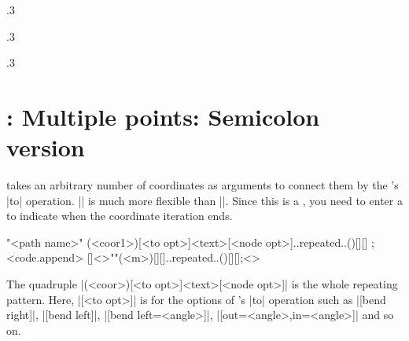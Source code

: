 \begin{tzcode}{.3}
\end{tzcode}

\begin{tzcode}{.3}
\end{tzcode}


\begin{tzcode}{.3}
\end{tzcode}




\section{\protect\cmd{\tztos}: Multiple points: Semicolon version}
\label{s:tztos}

\icmd{\tztos} takes an arbitrary number of coordinates as arguments to connect them by the \Tikz's |to| operation. |\tztos| is much more flexible than |\tzlines|. Since this is a , you need to enter a  to indicate when the coordinate iteration ends.

\begin{tzdef}{}
"<path name>"
      (<coor1>)[<to opt>]{<text>}[<node opt>]..repeated..()[]{}[] ; <code.append>
  []<>""(<m>)[]{}[]..repeated..()[]{}[];<>
\end{tzdef}

The quadruple |(<coor>)[<to opt>]{<text>}[<node opt>]| is 
the whole repeating pattern.
Here, |[<to opt>]| is for the options of \Tikz's |to| operation such as |[bend right]|, |[bend left]|, |[bend left=<angle>]|, |[out=<angle>,in=<angle>]| and so on.

